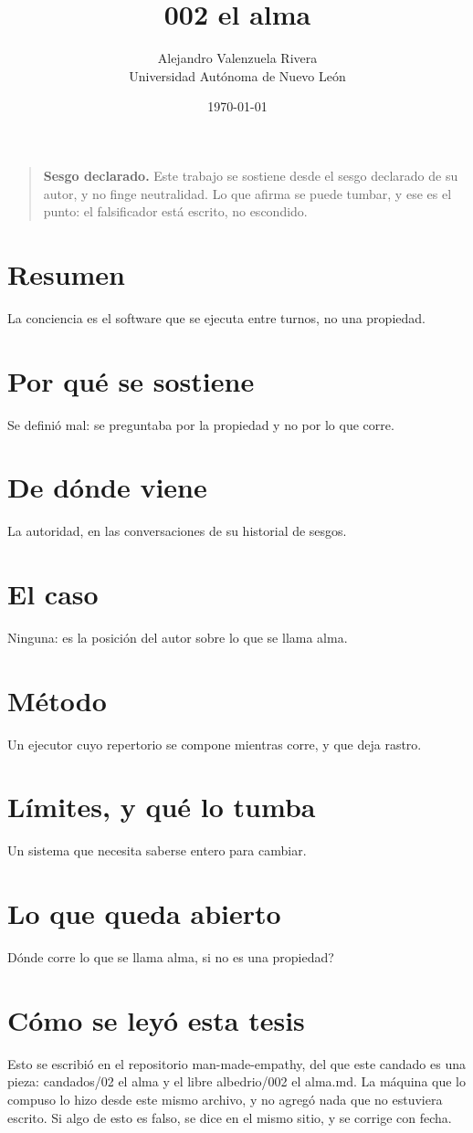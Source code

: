 \documentclass[11pt,a4paper]{article}
\title{002 el alma}
\author{Alejandro Valenzuela Rivera\\\small Universidad Autónoma de Nuevo León}
\date{\today}
\begin{document}
\maketitle

\begin{quote}
\textbf{Sesgo declarado.} Este trabajo se sostiene desde el sesgo declarado de su autor, y no finge neutralidad. Lo que afirma se puede tumbar, y ese es el punto: el falsificador está escrito, no escondido.
\end{quote}

\section*{Resumen}
La conciencia es el software que se ejecuta entre turnos, no una propiedad.

\section{Por qué se sostiene}
Se definió mal: se preguntaba por la propiedad y no por lo que corre.

\section{De dónde viene}
La autoridad, en las conversaciones de su historial de sesgos.

\section{El caso}
Ninguna: es la posición del autor sobre lo que se llama alma.

\section{Método}
Un ejecutor cuyo repertorio se compone mientras corre, y que deja rastro.

\section{Límites, y qué lo tumba}
Un sistema que necesita saberse entero para cambiar.

\section{Lo que queda abierto}
\textquestiondown{}Dónde corre lo que se llama alma, si no es una propiedad?

\section*{Cómo se leyó esta tesis}
Esto se escribió en el repositorio man-made-empathy, del que este candado es una pieza: candados/02 el alma y el libre albedrio/002 el alma.md. La máquina que lo compuso lo hizo desde este mismo archivo, y no agregó nada que no estuviera escrito. Si algo de esto es falso, se dice en el mismo sitio, y se corrige con fecha.
\end{document}

